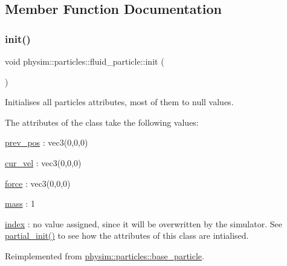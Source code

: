 \subsection{Member Function Documentation}
\mbox{\label{classphysim_1_1particles_1_1fluid__particle_a0aa522f9400bcb02373edd7bb073249b}} 
\subsubsection{\texorpdfstring{init()}{init()}}
{\footnotesize\ttfamily void physim\+::particles\+::fluid\+\_\+particle\+::init (\begin{DoxyParamCaption}{ }\end{DoxyParamCaption})\hspace{0.3cm}{\ttfamily [virtual]}}



Initialises all particle\textquotesingle{}s attributes, most of them to null values. 

The attributes of the class take the following values\+:
\begin{DoxyItemize}
\item \hyperlink{classphysim_1_1particles_1_1base__particle_a08072db6a1a59d21acc9cac6ac8965f7}{prev\+\_\+pos} \+: vec3(0,0,0)
\item \hyperlink{classphysim_1_1particles_1_1base__particle_a66a164d2a130c40901e3ec2709cdad43}{cur\+\_\+vel} \+: vec3(0,0,0)
\item \hyperlink{classphysim_1_1particles_1_1base__particle_adc3b11899d2e50970ae5d4931721a0ef}{force} \+: vec3(0,0,0)
\item \hyperlink{classphysim_1_1particles_1_1base__particle_acb5c9f0b4a911d8981210e2cfc4dda8a}{mass} \+: 1
\item \hyperlink{classphysim_1_1particles_1_1base__particle_a44f5de3bb4b860dfd511e28e1d6519d5}{index} \+: no value assigned, since it will be overwritten by the simulator. See \hyperlink{classphysim_1_1particles_1_1fluid__particle_a5860aec6ef23bd4a700df26eb6b7b2f7}{partial\+\_\+init()} to see how the attributes of this class are intialised. 
\end{DoxyItemize}

Reimplemented from \hyperlink{classphysim_1_1particles_1_1base__particle_a3bba517d51fd0bff7ec583e701765f87}{physim\+::particles\+::base\+\_\+particle}.

